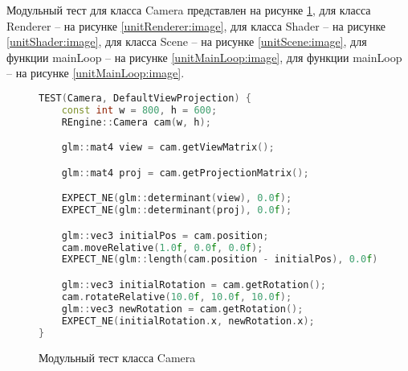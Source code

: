 

Модульный тест для класса Camera представлен на рисунке \ref{unitCamera:image}, для класса Renderer -- на рисунке \ref{unitRenderer:image}, для класса Shader -- на рисунке \ref{unitShader:image}, для класса Scene -- на рисунке \ref{unitScene:image}, для функции mainLoop -- на рисунке \ref{unitMainLoop:image}, для функции mainLoop -- на рисунке \ref{unitMainLoop:image}.

\begin{figure}[ht]
\begin{lstlisting}[language=C++]
TEST(Camera, DefaultViewProjection) {
    const int w = 800, h = 600;
    REngine::Camera cam(w, h);

    glm::mat4 view = cam.getViewMatrix();

    glm::mat4 proj = cam.getProjectionMatrix();

    EXPECT_NE(glm::determinant(view), 0.0f);
    EXPECT_NE(glm::determinant(proj), 0.0f);

    glm::vec3 initialPos = cam.position;
    cam.moveRelative(1.0f, 0.0f, 0.0f);
    EXPECT_NE(glm::length(cam.position - initialPos), 0.0f);

    glm::vec3 initialRotation = cam.getRotation();
    cam.rotateRelative(10.0f, 10.0f, 10.0f);
    glm::vec3 newRotation = cam.getRotation();
    EXPECT_NE(initialRotation.x, newRotation.x);
}
\end{lstlisting}  
\caption{Модульный тест класса Camera}
\label{unitCamera:image}
\end{figure}


